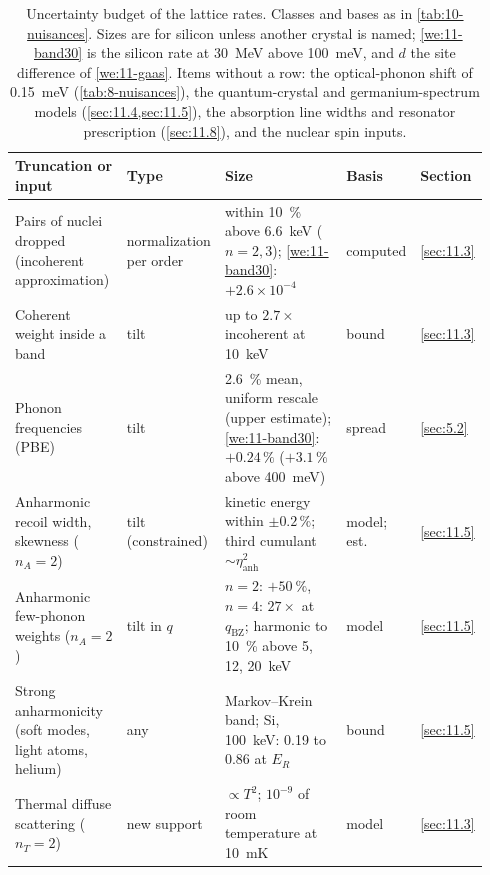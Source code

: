\begin{table}[tbp]
  \caption{Uncertainty budget of the lattice rates. Classes and bases as in \cref{tab:10-nuisances}. Sizes are for silicon unless another crystal is named; \cref{we:11-band30} is the silicon rate at \SI{30}{MeV} above \SI{100}{meV}, and $d$ the site difference of \cref{we:11-gaas}. Items without a row: the optical-phonon shift of \SI{0.15}{meV} (\cref{tab:8-nuisances}), the quantum-crystal and germanium-spectrum models (\cref{sec:11.4,sec:11.5}), the absorption line widths and resonator prescription (\cref{sec:11.8}), and the nuclear spin inputs.}
  \label{tab:11-nuisances}
  \centering\footnotesize\setlength{\tabcolsep}{3pt}
  \begin{tabular}{@{}>{\raggedright\arraybackslash}p{0.25\linewidth}>{\raggedright\arraybackslash}p{0.12\linewidth}>{\raggedright\arraybackslash}p{0.38\linewidth}>{\raggedright\arraybackslash}p{0.09\linewidth}>{\raggedright\arraybackslash}p{0.10\linewidth}@{}}
    \toprule
    Truncation or input & Type & Size & Basis & Section \\
    \midrule
    Pairs of nuclei dropped (incoherent approximation) & normali\-zation per order & within \SI{10}{\percent} above \SI{6.6}{keV} ($n = 2, 3$); \cref{we:11-band30}: $+2.6\times10^{-4}$ & computed & \cref{sec:11.3} \\
    Coherent weight inside a band & tilt & up to $2.7\times$ incoherent at \SI{10}{keV} & bound & \cref{sec:11.3} \\
    Phonon frequencies (PBE) & tilt & \SI{2.6}{\percent} mean, uniform rescale (upper estimate); \cref{we:11-band30}: $+0.24\,\%$ ($+3.1\,\%$ above \SI{400}{meV}) & spread & \cref{sec:5.2} \\
    Anharmonic recoil width, skewness ($n_A = 2$) & tilt (con\-strained) & kinetic energy within $\pm0.2\,\%$; third cumulant $\sim\eta_{\mathrm{anh}}^2$ & model; est. & \cref{sec:11.5} \\
    Anharmonic few-phonon weights ($n_A = 2$) & tilt in $q$ & $n = 2$: $+\SI{50}{\percent}$, $n = 4$: $27\times$ at $q_{\mathrm{BZ}}$; harmonic to \SI{10}{\percent} above 5, 12, \SI{20}{keV} & model & \cref{sec:11.5} \\
    Strong anharmonicity (soft modes, light atoms, helium) & any & Markov--Krein band; Si, \SI{100}{keV}: 0.19 to 0.86 at $E_R$ & bound & \cref{sec:11.5} \\
    Thermal diffuse scattering ($n_T = 2$) & new support & $\propto T^2$; $10^{-9}$ of room temperature at \SI{10}{mK} & model & \cref{sec:11.3} \\

\end{tabular}
\end{table}
